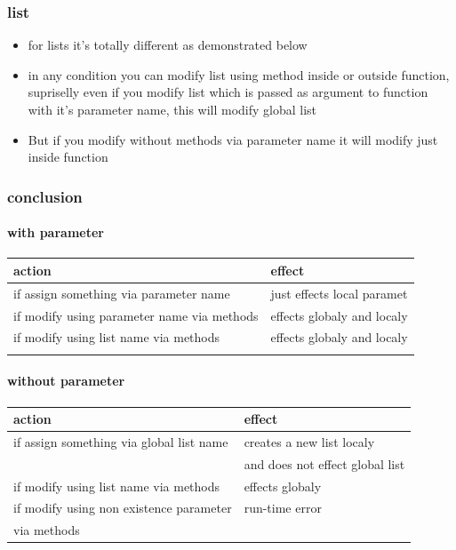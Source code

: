 \documentclass[11pt]{article}
\begin{document}
\subsubsection{list}
\label{sec:org797eb59}
\begin{itemize}
\item for lists it's totally different as demonstrated below
\item in any condition you can modify list using method inside or outside
function, supriselly even if you modify list which is passed as
argument to function with it's parameter name, this will modify
global list
\item But if you modify without methods via parameter name it will modify
just inside function
\end{itemize}

\subsubsection{conclusion}
\label{sec:org4ef1e67}

\paragraph{with parameter}
\label{sec:org85723f7}
\begin{center}
\begin{tabular}{ll}
action & effect\\
\hline
if assign something via parameter name & just effects local paramet\\
\hline
if modify using parameter name via methods & effects globaly and localy\\
\hline
if modify using list name via methods & effects globaly and localy\\
\hline
 & \\
\end{tabular}
\end{center}

\paragraph{without parameter}
\label{sec:org0fc9280}
\begin{center}
\begin{tabular}{ll}
action & effect\\
\hline
if assign something via global list name & creates a new list localy\\
 & and does not effect global list\\
\hline
if modify using list name via methods & effects globaly\\
\hline
if modify using non existence parameter & run-time error\\
via methods & \\
\end{tabular}
\end{center}
\end{document}
